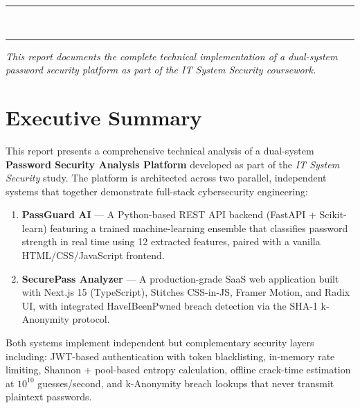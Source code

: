 \documentclass[12pt,a4paper]{article}
\begin{document}
\begin{titlepage}
    \vfill

    \noindent\rule{\linewidth}{0.4pt}\\[0.3em]
    \noindent\rule{\linewidth}{1.5pt}

    \vspace{0.5cm}
    {\small\textit{This report documents the complete technical implementation of a dual-system\\
    password security platform as part of the IT System Security coursework.}}
\end{titlepage}

\tableofcontents
\clearpage

\section{Executive Summary}

This report presents a comprehensive technical analysis of a dual-system
\textbf{Password Security Analysis Platform} developed as part of the
\textit{IT System Security} study. The platform is architected across two
parallel, independent systems that together demonstrate full-stack cybersecurity
engineering:

\begin{enumerate}
    \item \textbf{PassGuard AI} --- A Python-based REST API backend
    (FastAPI + Scikit-learn) featuring a trained machine-learning ensemble
    that classifies password strength in real time using 12 extracted features,
    paired with a vanilla HTML/CSS/JavaScript frontend.

    \item \textbf{SecurePass Analyzer} --- A production-grade SaaS web
    application built with Next.js 15 (TypeScript), Stitches CSS-in-JS,
    Framer Motion, and Radix UI, with integrated HaveIBeenPwned breach
    detection via the SHA-1 k-Anonymity protocol.
\end{enumerate}

Both systems implement independent but complementary security layers including:
JWT-based authentication with token blacklisting,
in-memory rate limiting,
Shannon + pool-based entropy calculation,
offline crack-time estimation at $10^{10}$ guesses/second,
and k-Anonymity breach lookups that never transmit plaintext passwords.
\end{document}
